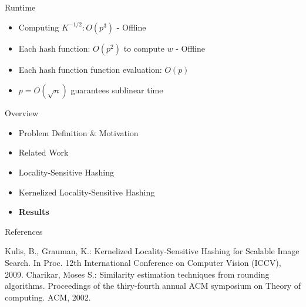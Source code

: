 \documentclass[12pt,a4paper]{beamer}
\begin{document}
\begin{frame}{Runtime}
\begin{itemize}
\item Computing $K^{-1/2}: O(p^{3})$ - Offline
\item Each hash function: $O(p^{2})$ to compute $w$ - Offline
\item Each hash function function evaluation: $O(p)$
\item $p = O(\sqrt{n})$ guarantees sublinear time
\end{itemize}
\end{frame}

\begin{frame}{Overview}
\begin{itemize}
\item Problem Definition \& Motivation
\item Related Work
\item Locality-Sensitive Hashing
\item Kernelized Locality-Sensitive Hashing
\item \textbf{Results}
\end{itemize}
\end{frame}


\begin{frame}{References}
\begin{thebibliography}{-}
 Kulis, B., Grauman, K.: Kernelized Locality-Sensitive Hashing for Scalable Image Search.
In Proc. 12th International Conference on Computer Vision (ICCV), 2009.
 Charikar, Moses S.: Similarity estimation techniques from rounding algorithms. Proceedings of the thiry-fourth annual ACM symposium on Theory of computing. ACM, 2002.
\end{thebibliography}
\end{frame}
\end{document}
